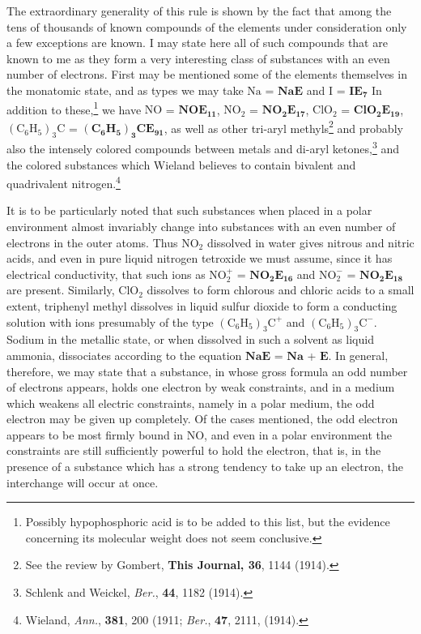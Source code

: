\documentclass[11pt]{memoir}
\begin{document}
The extraordinary generality of this rule is shown by the fact that among the tens of thousands of known compounds of the elements under consideration only a few exceptions are known.  I may state here all of such compounds that are known to me as they form a very interesting class of substances with an even number of electrons.  First may be mentioned some of the elements themselves in the monatomic state, and as types we may take $\mathrm{Na}$ = $\mathbf{NaE}$ and $\mathrm{I}$ = $\mathbf{IE_7}$  In addition to these,\footnote{Possibly hypophosphoric acid is to be added to this list, but the evidence concerning its molecular weight does not seem conclusive.} we have $\mathrm{NO}$ = $\mathbf{NOE_{11}}$, $\mathrm{NO_2}$ = $\mathbf{NO_2E_{17}}$, $\mathrm{ClO_2}$ = $\mathbf{ClO_2E_{19}}$, $\mathrm{(C_6H_5)_3C}$ = $\mathbf{(C_6H_5)_3CE_{91}}$, as well as other tri-aryl methyls\footnote{See the review by Gombert, \textbf{This Journal, 36}, 1144 (1914).} and probably also the intensely colored compounds between metals and di-aryl ketones,\footnote{Schlenk and Weickel, \emph{Ber.}, \textbf{44}, 1182 (1914).} and the colored substances which Wieland believes to contain bivalent and quadrivalent nitrogen.\footnote{Wieland, \emph{Ann.}, \textbf{381}, 200 (1911; \emph{Ber.}, \textbf{47}, 2111, (1914).}

It is to be particularly noted that such substances when placed in a polar environment almost invariably change into substances with an even number of electrons in the outer atoms.  Thus $\mathrm{NO_2}$ dissolved in water gives nitrous and nitric acids, and even in pure liquid nitrogen tetroxide we must assume, since it has electrical conductivity, that such ions as $\mathrm{NO_2^+}$ = $\mathbf{NO_2E_{16}}$ and $\mathrm{NO_2^-}$ = $\mathbf{NO_2E_{18}}$ are present.  Similarly, $\mathrm{ClO_2}$ dissolves to form chlorous and chloric acids to a small extent, triphenyl methyl dissolves in liquid sulfur dioxide to form a conducting solution with ions presumably of the type $\mathrm{(C_6H_5)_3C^+}$ and $\mathrm{(C_6H_5)_3C^-}$.  Sodium in the metallic state, or when dissolved in such a solvent as liquid ammonia, dissociates according to the equation $\mathbf{NaE}$ = $\mathbf{Na}$ + $\mathbf{E}$.  In general, therefore, we may state that a substance, in whose gross formula an odd number of electrons appears, holds one electron by weak constraints, and in a medium which weakens all electric constraints, namely in a polar medium, the odd electron may be given up completely.  Of the cases mentioned, the odd electron appears to be most firmly bound in $\mathrm{NO}$, and even in a polar environment the constraints are still sufficiently powerful to hold the electron, that is, in the presence of a substance which has a strong tendency to take up an electron, the interchange will occur at once.
\end{document}
